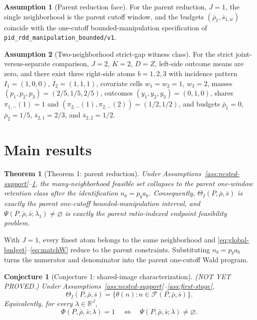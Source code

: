 \documentclass[11pt]{article}
\newcommand{\R}{\mathbb{R}}
\theoremstyle{definition}
\newtheorem{assumption}{Assumption}
\theoremstyle{plain}
\newtheorem{theorem}{Theorem}
\newtheorem{conjecture}{Conjecture}
\theoremstyle{remark}
\begin{document}
\begin{assumption}[Parent reduction face]\label{ass:parent-face}
For the parent reduction, \(J=1\), the single neighborhood is the parent cutoff window, and the
budgets \((\bar\rho_1,\bar s_{1,w})\) coincide with the one-cutoff bounded-manipulation
specification of \texttt{pid\_rdd\_manipulation\_bounded/v1}.
\end{assumption}

\begin{assumption}[Two-neighborhood strict-gap witness class]\label{ass:strict-gap}
For the strict joint-versus-separate comparison, \(J=2\), \(K=2\), \(D=Z\), left-side outcome
means are zero, and there exist three right-side atoms \(b=1,2,3\) with incidence pattern
\(I_1=(1,0,0)\), \(I_2=(1,1,1)\), covariate cells \(w_1=w_2=1\), \(w_3=2\), masses
\((p_1,p_2,p_3)=(2/5,1/5,2/5)\), outcomes \((y_1,y_2,y_3)=(0,1,0)\), shares
\(\pi_{1,-}(1)=1\) and \((\pi_{2,-}(1),\pi_{2,-}(2))=(1/2,1/2)\), and budgets
\(\bar\rho_1=0\), \(\bar\rho_2=1/5\), \(\bar s_{2,1}=2/3\), and \(\bar s_{2,2}=1/2\).
\end{assumption}

\section{Main results}
\begin{theorem}[Theorem 1: parent reduction]\label{thm:parent-reduction}
Under Assumptions~\ref{ass:nested-support}--\ref{ass:parent-face}, the many-neighborhood
feasible set collapses to the parent one-window retention class after the identification
\(n_b=p_b a_b\). Consequently, \(\Theta_I(P,\bar\rho,\bar s)\) is exactly the parent
one-cutoff bounded-manipulation interval, and
\(\Psi(P,\bar\rho,\bar s;\lambda_1)\neq\varnothing\) is exactly the parent ratio-indexed
endpoint feasibility problem.
\end{theorem}

With \(J=1\), every finest atom belongs to the same neighborhood and
\eqref{eq:global-budget}--\eqref{eq:matchW} reduce to the parent constraints. Substituting
\(n_b=p_b a_b\) turns the numerator and denominator into the parent one-cutoff Wald program.

\begin{conjecture}[Conjecture 1: shared-image characterization]\label{conj:shared-image}
(NOT YET PROVED.) Under Assumptions~\ref{ass:nested-support}--\ref{ass:first-stage},
\[
  \Theta_I(P,\bar\rho,\bar s)=\{\theta(n):n\in\mathcal F(P,\bar\rho,\bar s)\}.
\]
Equivalently, for every \(\lambda\in\R^J\),
\[
  \Phi(P,\bar\rho,\bar s;\lambda)=1
  \quad\Longleftrightarrow\quad
  \Psi(P,\bar\rho,\bar s;\lambda)\neq\varnothing.
\]
\end{conjecture}
\end{document}
